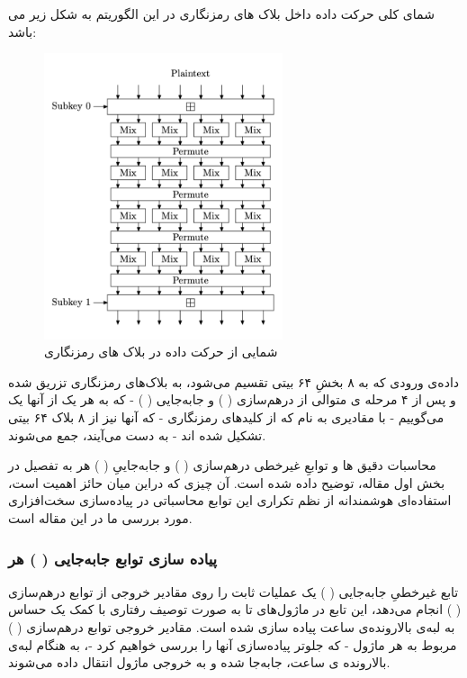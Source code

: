 شمای کلی حرکت داده داخل بلاک های رمزنگاری در این الگوریتم به شکل زیر می باشد:
\begin{figure}[H]
	\centering
	\includegraphics[width=7cm]{images/cipherblock_dataflow.png}	
	\caption{شمایی از حرکت داده در بلاک های رمزنگاری}
\end{figure}
داده‌ی ورودی که به ۸ بخشِ ۶۴ بیتی تقسیم می‌شود، به بلاک‌های رمزنگاری تزریق شده و پس از ۴ مرحله ی متوالی از درهم‌سازی 
(
)
و
 جابه‌جایی 
 (
 )
 - که به هر‌ یک از آنها یک
 می‌گوییم -  
 با مقادیری به نام 
که از کلید‌های رمزنگاری - که آنها نیز از ۸ بلاک ۶۴ بیتی تشکیل شده اند - به دست می‌آیند، جمع می‌شوند.

محاسبات دقیق
ها و توابعِ غیرخطی 
درهم‌سازی 
(
)
و
جابه‌جاییِ 
(
)
 هر
به تفصیل در بخش اول مقاله، توضیح داده شده است. آن چیزی که در‌این میان حائز اهمیت است، استفاده‌ای هوشمندانه از نظم تکراری این توابع محاسباتی در پیاده‌سازی سخت‌افزاری مورد بررسی ما در این مقاله است.
\pagebreak

\subsubsection{
	پیاده سازی توابع جابه‌جایی 
	(
	)
	هر
}
 تابع غیرخطیِ جابه‌جایی
(
)
یک عملیات ثابت را روی مقادیر خروجی از توابع درهم‌سازی
(
)
انجام می‌دهد، این تابع در ماژول‌های 
تا 
به صورت توصیف رفتاری با کمک یک 
حساس به لبه‌ی بالا‌رونده‌ی ساعت پیاده سازی شده است.
مقادیر خروجی توابع درهم‌سازی (
)
مربوط به هر ماژول - که جلوتر پیاده‌سازی آنها را بررسی خواهیم کرد -، به هنگام لبه‌ی بالارونده ی ساعت، جابه‌جا شده و به خروجی ماژول انتقال داده می‌شوند. 


